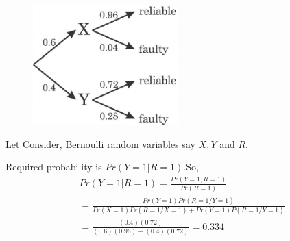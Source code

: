 %
\begin{figure}[htb!]
\begin{center}
\includegraphics[width=0.5\textwidth]{solutions/cs/2012/63/Figures/A_4_1.png}
\end{center}
\end{figure}
Let Consider, Bernoulli random variables say $X,Y$ and $R$.
\begin{table}[h]
\caption{probability of random variables.}
\label{tab:my-table}
\end{table}
Required probability is $Pr(Y=1|R=1)$.So,
\begin{align}
&Pr(Y=1|R=1)=\frac{Pr(Y=1,R=1)}{Pr(R=1)}\\
&=\frac{Pr(Y=1)Pr(R=1/Y=1)}{Pr(X=1)Pr(R=1/X=1)+Pr(Y=1)P(R=1/Y=1)}\\
&=\frac{(0.4)(0.72)}{(0.6)(0.96)+(0.4)(0.72)}=0.334
\end{align}
